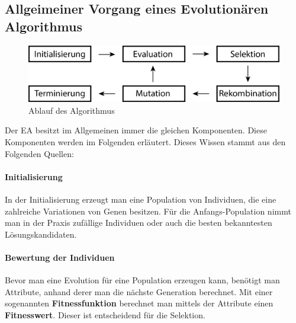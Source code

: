 \subsection{Allgeimeiner Vorgang eines Evolution{\"a}ren Algorithmus}
\begin{figure}
	\centering
    \includegraphics[width=\textwidth]{pics/algoSchritte.png}
    \caption{Ablauf des Algorithmus}
    \label{fig:algoSchritte}
\end{figure}
Der EA besitzt im Allgemeinen immer die gleichen Komponenten. Diese Komponenten werden im Folgenden erl{\"a}utert. Dieses Wissen stammt aus den Folgenden Quellen: \cite{shiffman2012nature, flickevolutionare, weicker2015evolutionare}

\paragraph*{Initialisierung}
In der Initialisierung erzeugt man eine Population von Individuen, die eine zahlreiche Variationen von Genen besitzen. F{\"u}r die Anfangs-Population nimmt man in der Praxis zuf{\"a}llige Individuen oder auch die besten bekanntesten L{\"o}sungskandidaten.

\paragraph*{Bewertung der Individuen}
Bevor man eine Evolution f{\"u}r eine Population erzeugen kann, ben{\"o}tigt man Attribute, anhand derer man die n{\"a}chste Generation berechnet. 
Mit einer sogenannten \textbf{Fitnessfunktion} berechnet man mittels der Attribute einen \textbf{Fitnesswert}. Dieser ist entscheidend f{\"u}r die Selektion.



